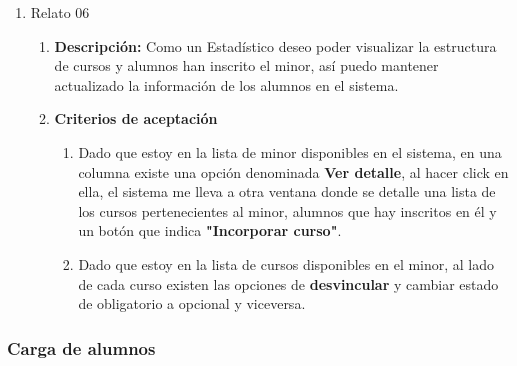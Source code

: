 \begin{enumerate}
\begin{enumerate}
\begin{enumerate}
				\end{enumerate}
		\end{enumerate}
	\item Relato 06
		\begin{enumerate}
			\item \textbf{Descripción:} Como un Estadístico deseo poder visualizar la estructura de cursos y alumnos han inscrito el minor, así puedo mantener actualizado la información de los alumnos en el sistema.
			\item \textbf{Criterios de aceptación}
				\begin{enumerate}
					\item Dado que estoy en la lista de minor disponibles en el sistema, en una columna existe una opción denominada \textbf{Ver detalle}, al hacer click en ella, el sistema me lleva a otra ventana donde se detalle una lista de los cursos pertenecientes al minor, alumnos que hay inscritos en él y un botón que indica \textbf{"Incorporar curso"}.
					\item Dado que estoy en la lista de cursos disponibles en el minor, al lado de cada curso existen las opciones de \textbf{desvincular} y cambiar estado de obligatorio a opcional y viceversa.
				\end{enumerate}
		\end{enumerate}
\end{enumerate}

\subsubsection{Carga de alumnos}

